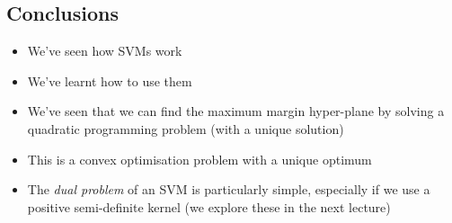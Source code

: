 
\begin{slide}
\section{Conclusions}

\begin{PauseHighLight}
  \begin{itemize}
  \item We've seen how SVMs work\pause
  \item We've learnt how to use them\pause
  \item We've seen that we can find the maximum margin hyper-plane by
    solving a quadratic programming problem (with a unique
    solution)\pause
  \item This is a convex optimisation problem with a unique
    optimum\pause
  \item The \emph{dual problem} of an SVM is particularly simple,
    especially if we use a positive semi-definite kernel\pause{} (we
    explore these in the next lecture)\pauseb
  \end{itemize}
\end{PauseHighLight}


\end{slide}



